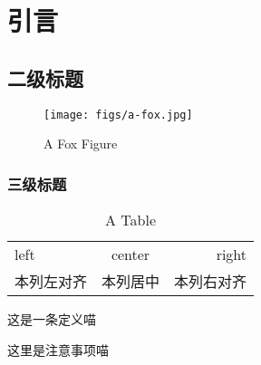 \chapter{引言}

\section{二级标题}

\zhlipsum

\begin{figure}[H]
\centering
\texttt{[image: figs/a-fox.jpg]}
\caption{A Fox Figure}
\label{fig.1}
\end{figure}

\subsection{三级标题}

\begin{table}
\caption{A Table}
\begin{tabular}{lcr}
left&center&right\\  
本列左对齐&本列居中&本列右对齐\\
\end{tabular}
\end{table}

\begin{definition}
这是一条定义喵
\end{definition}

\begin{notice*}
这里是注意事项喵
\end{notice*}

\zhlipsum
